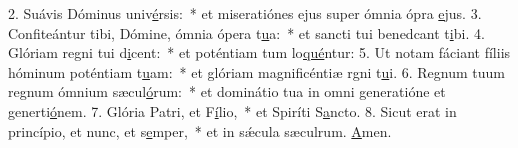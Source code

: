 2. Suávis Dóminus univ\uline{é}rsis:~* et miseratiónes ejus super ómnia ópra \uline{e}jus.
3. Confiteántur tibi, Dómine, ómnia ópera t\uline{u}a:~* et sancti tui benedcant t\uline{i}bi.
4. Glóriam regni tui d\uline{i}cent:~* et poténtiam tum lo\uline{qué}ntur:
5. Ut notam fáciant fíliis hóminum poténtiam t\uline{u}am:~* et glóriam magnificéntiæ rgni t\uline{u}i.
6. Regnum tuum regnum ómnium sæcul\uline{ó}rum:~* et dominátio tua in omni generatióne et generti\uline{ó}nem.
7. Glória Patri, et F\uline{í}lio,~* et Spiríti S\uline{a}ncto.
8. Sicut erat in princípio, et nunc, et s\uline{e}mper,~* et in sǽcula sæculrum. \uline{A}men.
